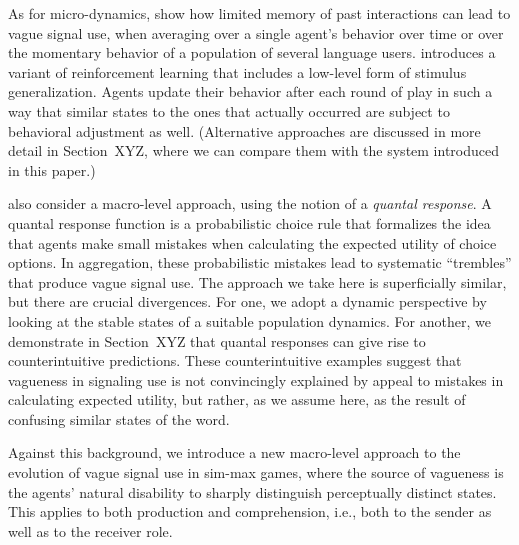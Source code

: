 As for micro-dynamics, \citet{FrankeJager2010:Vagueness-Signa} show
how limited memory of past interactions can lead to vague signal use,
when averaging over a single agent's behavior over time or over the
momentary behavior of a population of several language
users. \citet{OConnor2013:The-Evolution-o} introduces a variant of
reinforcement learning that includes a low-level form of stimulus
generalization. Agents update their behavior after each round of play
in such a way that similar states to the ones that actually occurred
are subject to behavioral adjustment as well. (Alternative approaches
are discussed in more detail in Section~XYZ, where we can compare them
with the system introduced in this paper.)

\citet{FrankeJager2010:Vagueness-Signa} also consider a macro-level
approach, using the notion of a \emph{quantal response}. A quantal
response function is a probabilistic choice rule that formalizes the
idea that agents make small mistakes when calculating the expected
utility of choice options. In aggregation, these probabilistic
mistakes lead to systematic ``trembles'' that produce vague signal
use. The approach we take here is superficially similar, but there are
crucial divergences. For one, we adopt a dynamic perspective by
looking at the stable states of a suitable population dynamics. For
another, we demonstrate in Section~XYZ that quantal responses can give
rise to counterintuitive predictions. These counterintuitive examples
suggest that vagueness in signaling use is not convincingly explained
by appeal to mistakes in calculating expected utility, but rather, as
we assume here, as the result of confusing similar states of the word.

Against this background, we introduce a new macro-level approach
to the evolution of vague signal use in sim-max games, where the
source of vagueness is the agents' natural disability to sharply
distinguish perceptually distinct states. This applies to both
production and comprehension, i.e., both to the sender as well as to
the receiver role. 

